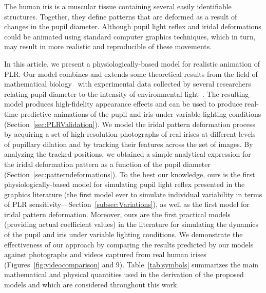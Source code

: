 \documentclass{acmtog} %
\begin{document}
The human iris is a muscular tissue containing several easily
identifiable structures. Together, they define patterns that are
deformed as a result of changes in the pupil diameter. Although pupil
light reflex and iridal deformations could be animated using standard
computer graphics techniques, which in turn, may result in more
realistic and reproducible of these movements.

In this article, we present a physiologically-based model for realistic
animation of PLR. Our model combines and extends some theoretical
results from the field of mathematical biology~\cite{CDFKMS-06} with
experimental data collected by several {researchers} relating pupil
diameter to the intensity of environmental
light~\cite{BCHH:Collewijn:1988}. The resulting model produces
high-fidelity appearance effects and can be used to produce real-time
predictive animations of the pupil and iris under variable lighting
conditions (Section~\ref{sec:PLRValidation}). We model the iridal
pattern deformation process by acquiring a set of high-resolution
photographs of real irises at different levels of pupillary dilation and
by tracking their features across the set of images. By analyzing the
tracked positions, we obtained a simple analytical expression for the
iridal deformation pattern as a function of the pupil diameter
(Section~\ref{sec:patterndeformations}). To the best our knowledge, ours
is the first physiologically-based model for simulating pupil light
reflex presented in the graphics literature (the first model ever to
simulate individual variability in terms of PLR
sensitivity---Section~\ref{subsec:Variations}), as well as the first
model for iridal pattern deformation. Moreover, ours are the first
practical models (providing actual coefficient values) in the literature
for simulating the dynamics of the pupil and iris under variable
lighting conditions. We demonstrate the effectiveness of our approach by
comparing the results predicted by our models against photographs and
videos captured from real human irises
(Figures~\ref{fig:videocomparison} and 9). Table~\ref{tab:symbols}
summarizes the main mathematical and physical quantities used in the
derivation of the proposed models and which are considered throughout
this work.
\end{document}
